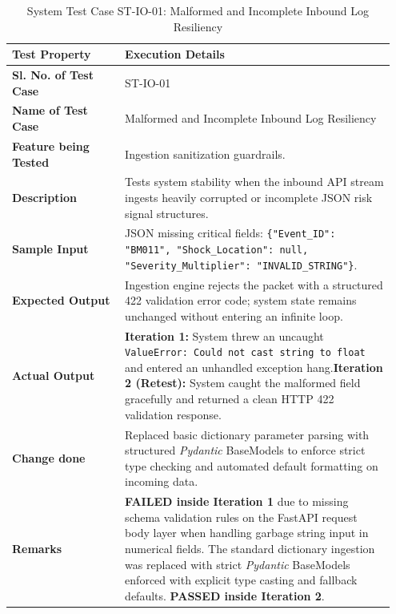 \begin{table}[H]
    \centering
    \caption{System Test Case ST-IO-01: Malformed and Incomplete Inbound Log Resiliency}
    \label{tab:stio01}
    \begin{tabular}{|p{0.28\linewidth}|p{0.67\linewidth}|}
        \hline
        \textbf{Test Property} & \textbf{Execution Details} \\ \hline
        \textbf{Sl. No. of Test Case} & ST-IO-01 \\ \hline
        \textbf{Name of Test Case} & Malformed and Incomplete Inbound Log Resiliency \\ \hline
        \textbf{Feature being Tested} & Ingestion sanitization guardrails. \\ \hline
        \textbf{Description} & Tests system stability when the inbound API stream ingests heavily corrupted or incomplete JSON risk signal structures. \\ \hline
        \textbf{Sample Input} & JSON missing critical fields: \texttt{\{"Event\_ID": "BM011", "Shock\_Location": null, "Severity\_Multiplier": "INVALID\_STRING"\}}. \\ \hline
        \textbf{Expected Output} & Ingestion engine rejects the packet with a structured 422 validation error code; system state remains unchanged without entering an infinite loop. \\ \hline
        \textbf{Actual Output} & \textbf{Iteration 1:} System threw an uncaught \texttt{ValueError: Could not cast string to float} and entered an unhandled exception hang.\newline \textbf{Iteration 2 (Retest):} System caught the malformed field gracefully and returned a clean HTTP 422 validation response. \\ \hline
        \textbf{Change done} & Replaced basic dictionary parameter parsing with structured \textit{Pydantic} BaseModels to enforce strict type checking and automated default formatting on incoming data. \\ \hline
        \textbf{Remarks} & \textbf{FAILED inside Iteration 1} due to missing schema validation rules on the FastAPI request body layer when handling garbage string input in numerical fields. The standard dictionary ingestion was replaced with strict \textit{Pydantic} BaseModels enforced with explicit type casting and fallback defaults. \textbf{PASSED inside Iteration 2}. \\ \hline
    \end{tabular}
\end{table}

